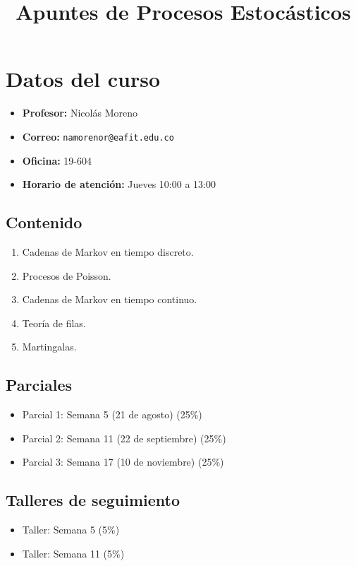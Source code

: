 \documentclass[12pt,a4paper]{article}
\title{Apuntes de Procesos Estocásticos}
\author{}
\date{}
\begin{document}
\maketitle

\section{Datos del curso}
\begin{itemize}
    \item \textbf{Profesor:} Nicolás Moreno
    \item \textbf{Correo:} \texttt{namorenor@eafit.edu.co}
    \item \textbf{Oficina:} 19-604
    \item \textbf{Horario de atención:} Jueves 10:00 a 13:00
\end{itemize}

\subsection*{Contenido}
\begin{enumerate}
    \item Cadenas de Markov en tiempo discreto.
    \item Procesos de Poisson.
    \item Cadenas de Markov en tiempo continuo.
    \item Teoría de filas.
    \item Martingalas.
\end{enumerate}

\subsection*{Parciales}
\begin{itemize}
    \item Parcial 1: Semana 5 (21 de agosto) \hfill (25\%)
    \item Parcial 2: Semana 11 (22 de septiembre) \hfill (25\%)
    \item Parcial 3: Semana 17 (10 de noviembre) \hfill (25\%)
\end{itemize}

\subsection*{Talleres de seguimiento}
\begin{itemize}
    \item Taller: Semana 5 \hfill (5\%)
    \item Taller: Semana 11 \hfill (5\%)
\end{itemize}
\end{document}
